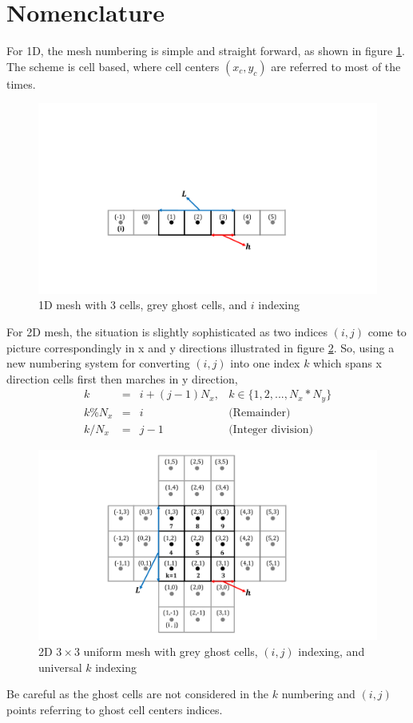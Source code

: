 \documentclass[12pt]{amsart}   %
\begin{document}
\section{Nomenclature}
For 1D, the mesh numbering is simple and straight forward, as shown in figure \ref{fig:1}. The scheme is cell based, where cell centers $(x_c,y_c)$ are referred to most of the times.
\begin{figure}[b!]
    \centering
    \includegraphics[width=\linewidth]{fig1_1D.pdf}
    \caption{1D mesh with 3 cells, grey ghost cells, and $i$ indexing}
    \label{fig:1}
\end{figure}

For 2D mesh, the situation is slightly sophisticated as two indices $(i,j)$ come to picture correspondingly in x and y directions illustrated in figure \ref{fig:2}. So, using a new numbering system for converting $(i,j)$ into one index $k$ which spans x direction cells first then marches in y direction, 
\begin{eqnarray}
k &=& i+(j-1)N_x, & k \in\{1,2,...,N_x*N_y\} \nonumber\\
k\%N_x &=& i & \text{(Remainder)}  \\
k/N_x &=& j-1 &\text{(Integer division)}  \nonumber 
\end{eqnarray}

\begin{figure}
    \centering
    \includegraphics[width=\linewidth]{fig2_2D.pdf}
    \caption{2D $3\times3$ uniform mesh with grey ghost cells, $(i,j)$ indexing, and universal $k$ indexing}
    \label{fig:2}
\end{figure}
Be careful as the ghost cells are not considered in the $k$ numbering and $(i,j)$ points referring to ghost cell centers indices.
\end{document}
